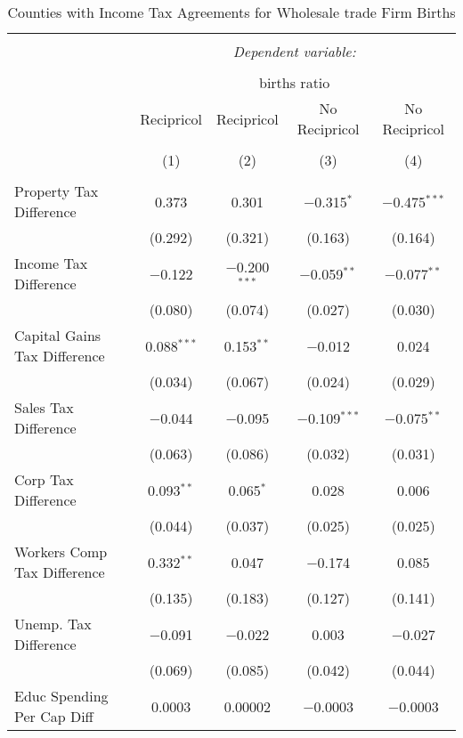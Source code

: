 
\begin{table}[!htbp] \centering 
  \caption{Counties with Income Tax Agreements for  Wholesale trade Firm Births} 
  \label{42rd} 
\begin{tabular}{@{\extracolsep{5pt}}lcccc} 
\\[-1.8ex]\hline 
\hline \\[-1.8ex] 
 & \multicolumn{4}{c}{\textit{Dependent variable:}} \\ 
\cline{2-5} 
\\[-1.8ex] & \multicolumn{4}{c}{births ratio} \\ 
 & Recipricol & Recipricol & No Recipricol & No Recipricol \\ 
\\[-1.8ex] & (1) & (2) & (3) & (4)\\ 
\hline \\[-1.8ex] 
 Property Tax Difference & 0.373 & 0.301 & $-$0.315$^{*}$ & $-$0.475$^{***}$ \\ 
  & (0.292) & (0.321) & (0.163) & (0.164) \\ 
  Income Tax Difference & $-$0.122 & $-$0.200$^{***}$ & $-$0.059$^{**}$ & $-$0.077$^{**}$ \\ 
  & (0.080) & (0.074) & (0.027) & (0.030) \\ 
  Capital Gains Tax Difference & 0.088$^{***}$ & 0.153$^{**}$ & $-$0.012 & 0.024 \\ 
  & (0.034) & (0.067) & (0.024) & (0.029) \\ 
  Sales Tax Difference & $-$0.044 & $-$0.095 & $-$0.109$^{***}$ & $-$0.075$^{**}$ \\ 
  & (0.063) & (0.086) & (0.032) & (0.031) \\ 
  Corp Tax Difference & 0.093$^{**}$ & 0.065$^{*}$ & 0.028 & 0.006 \\ 
  & (0.044) & (0.037) & (0.025) & (0.025) \\ 
  Workers Comp Tax Difference & 0.332$^{**}$ & 0.047 & $-$0.174 & 0.085 \\ 
  & (0.135) & (0.183) & (0.127) & (0.141) \\ 
  Unemp. Tax Difference & $-$0.091 & $-$0.022 & 0.003 & $-$0.027 \\ 
  & (0.069) & (0.085) & (0.042) & (0.044) \\ 
  Educ Spending Per Cap Diff & 0.0003 & 0.00002 & $-$0.0003 & $-$0.0003 \\ 

\end{tabular}
\end{table}
